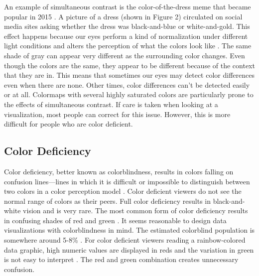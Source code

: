 \documentclass[journal,12pt]{IEEEtran}
\begin{document}
An example of simultaneous contrast is the 
color-of-the-dress meme that became popular in 2015 \cite{colorofthedress}. A picture of a dress
(shown in Figure 2)
circulated on social media sites asking whether the dress was black-and-blue
or white-and-gold. This effect happens because our eyes perform a kind 
of normalization under different light conditions and alters
the perception of what the colors look like \cite{viridis}.
The same shade of gray can appear very different as the surrounding color changes.
Even though the colors are the same, they appear to be 
different because of the context that they are in. This means that sometimes
our eyes may detect color differences even when there are none.
Other times, color differences can't be detected easily or at all.
Colormaps with several highly saturated colors are particularly prone to the effects
of simultaneous contrast. If care is taken when looking at a visualization,
most people can correct for this issue.
However, this is more difficult for people who are color deficient.

\subsection{Color Deficiency}

Color deficiency, better known as colorblindness, results in colors falling on confusion lines---lines in which it
is difficult or impossible to distinguish between two colors in a color perception model \cite{colormapping}.
Color deficient viewers do not see the normal range of colors as their peers.
Full color deficiency results in black-and-white vision and is very rare.
The most common form of color deficiency results in confusing shades of red and green \cite{colorchoice}.
It seems reasonable to design data
visualizations with colorblindness in mind.
The estimated colorblind population is somewhere around 5-8\%
 \cite{colormapping,mapcvi,rainbowstill,spectralschemes,colorvblackwhite,matlab}.
For color deficient viewers reading a rainbow-colored data graphic,
high numeric values are displayed in reds and
the variation in green is not easy to interpret \cite{mapcvi}. The red and green
combination creates unnecessary confusion.
\end{document}
